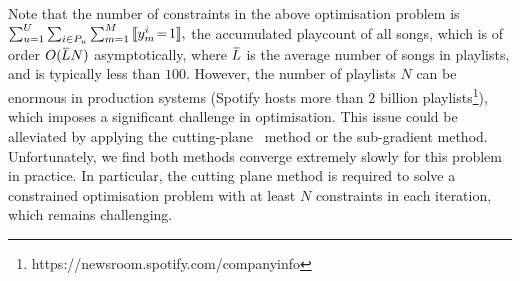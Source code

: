Note that the number of constraints in the above optimisation problem is
$
\sum_{u=1}^U \sum_{i \in P_u} \sum_{m=1}^M \, \llbracket y_m^i \!= \!1 \rrbracket,
$
\ie the accumulated playcount of all songs,
which is of order {\small $O(\widebar{L} N)$} asymptotically, where {\small $\widebar{L}$} 
is the average number of songs in playlists, and is typically less than $100$.
However,
the number of playlists {\small $N$} can be enormous %
in production systems 
(\eg Spotify hosts more than $2$ billion playlists\footnote{https://newsroom.spotify.com/companyinfo}),
which imposes a significant challenge in optimisation. 
%
This issue could be alleviated by applying the cutting-plane~\cite{avriel2003nonlinear} method or the sub-gradient method.
Unfortunately, we find both methods converge extremely slowly for this problem in practice.
In particular, the cutting plane method is required to solve 
a constrained optimisation problem with at least {\small $N$} constraints in each iteration, 
which remains challenging. %

%

